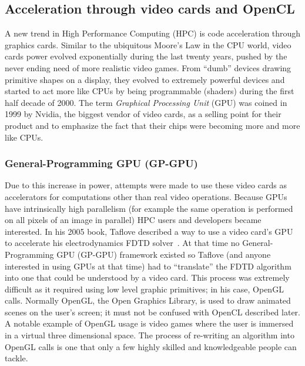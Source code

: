 \subsection{Acceleration through video cards and OpenCL}
\label{section:tools:opencl}

A new trend in High Performance Computing (HPC) is code acceleration
through graphics cards. Similar to the ubiquitous Moore's Law in the CPU world,
video cards power evolved exponentially during the last twenty years, pushed
by the never ending need of more realistic video games. From ``dumb'' devices
drawing primitive shapes on a display, they evolved to extremely powerful
devices and started to act more like CPUs by being programmable (shaders) during
the first half decade  of 2000. The term \textit{Graphical Processing Unit} (GPU) was
coined in 1999 by Nvidia, the biggest vendor of video cards, as a selling point
for their product and to emphasize the fact that their chips were becoming more
and more like CPUs.


\subsubsection{General-Programming GPU (GP-GPU)}

Due to this increase in power, attempts were made to use these video cards as
accelerators for computations other than real video operations. Because GPUs have
intrinsically high parallelism (for example the same operation is performed on
all pixels of an image in parallel) HPC users and developers became interested.
In his 2005 book, Taflove described a way to use a video card's GPU to
accelerate his electrodynamics FDTD solver~\cite{Taflove2005}. At that time no
General-Programming GPU (GP-GPU) framework existed so Taflove (and anyone
interested in using GPUs at that time) had to ``translate'' the FDTD algorithm
into one that could be understood by a video card. This process was extremely
difficult as it required using low level graphic primitives; in his case, OpenGL
calls.
Normally OpenGL, the Open Graphics Library,
is used to draw animated scenes on the user's screen; it must not be confused
with OpenCL described later.
A notable example of OpenGL usage is video games where the user is immersed in a
virtual three dimensional space. The process of re-writing an algorithm into
OpenGL calls is one that only a few highly skilled and knowledgeable people can
tackle.


